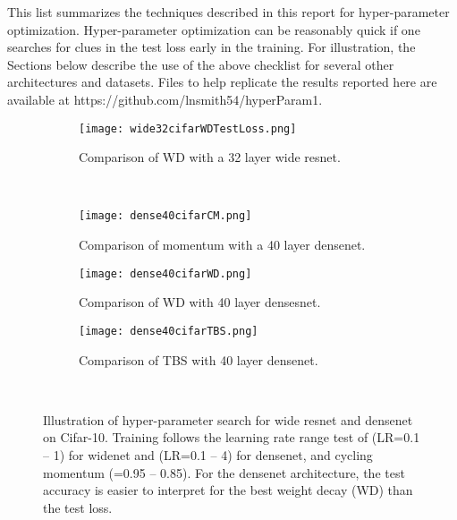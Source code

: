 \documentclass{article} %
\begin{document}
This list summarizes the techniques described in this report for hyper-parameter optimization. Hyper-parameter optimization can be reasonably quick if one searches for clues in the test loss early in the training.  For illustration, the Sections below describe the use of the above checklist for several other architectures and datasets.  Files to help replicate the results reported here are available at https://github.com/lnsmith54/hyperParam1.

\begin{figure}[tbh]
	\centering
	\begin{subfigure}[b]{0.46\textwidth}
		\texttt{[image: wide32cifarWDTestLoss.png]}
		\caption{Comparison of WD with a 32 layer wide resnet.}
		\label{fig:wide32cifarWDTestLoss}       %
	\end{subfigure}
	\hfill
	~ %
	\centering
	\begin{subfigure}[b]{0.46\textwidth}
		\texttt{[image: dense40cifarCM.png]}
		\caption{Comparison of momentum with a 40 layer densenet. }
		\label{fig:dense40cifarCM}       %
	\end{subfigure}
	\quad
	\hfill
	\centering
	\begin{subfigure}[b]{0.46\textwidth}
		\texttt{[image: dense40cifarWD.png]}
		\caption{Comparison of WD with 40 layer densesnet.}
		\label{fig:dense40cifarWD}       %
	\end{subfigure}
	\hfill
	\centering
	\begin{subfigure}[b]{0.46\textwidth}
		\texttt{[image: dense40cifarTBS.png]}
		\caption{Comparison of TBS with 40 layer densenet. }
		\label{fig:dense40cifarTBS}       %
	\end{subfigure}
	~ %
	\caption{Illustration of hyper-parameter search for wide resnet and densenet on Cifar-10.  Training follows the learning rate range test  of (LR=0.1 -- 1) for widenet and (LR=0.1 -- 4) for densenet, and cycling momentum (=0.95 -- 0.85).  For the densenet architecture, the test accuracy is easier to interpret for the best weight decay (WD)  than the test loss.}
	\label{fig:WideDensenet}
	\vspace{-5pt}	
\end{figure}
\end{document}
